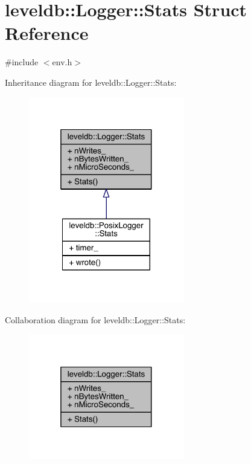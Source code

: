 \hypertarget{structleveldb_1_1_logger_1_1_stats}{}\section{leveldb\+:\+:Logger\+:\+:Stats Struct Reference}
\label{structleveldb_1_1_logger_1_1_stats}


{\ttfamily \#include $<$env.\+h$>$}



Inheritance diagram for leveldb\+:\+:Logger\+:\+:Stats\+:
\nopagebreak
\begin{figure}[H]
\begin{center}
\leavevmode
\includegraphics[width=193pt]{structleveldb_1_1_logger_1_1_stats__inherit__graph}
\end{center}
\end{figure}


Collaboration diagram for leveldb\+:\+:Logger\+:\+:Stats\+:
\nopagebreak
\begin{figure}[H]
\begin{center}
\leavevmode
\includegraphics[width=193pt]{structleveldb_1_1_logger_1_1_stats__coll__graph}
\end{center}
\end{figure}
